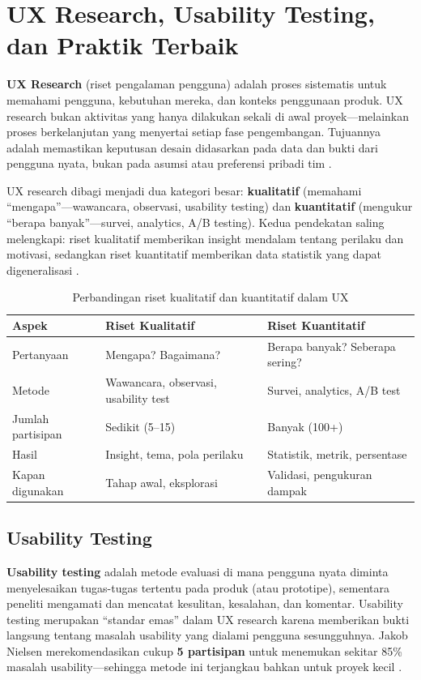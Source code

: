 ﻿\section{UX Research, Usability Testing, dan Praktik Terbaik}

\textbf{UX Research} (riset pengalaman pengguna) adalah proses sistematis untuk memahami pengguna, kebutuhan mereka, dan konteks penggunaan produk. UX research bukan aktivitas yang hanya dilakukan sekali di awal proyek---melainkan proses berkelanjutan yang menyertai setiap fase pengembangan. Tujuannya adalah memastikan keputusan desain didasarkan pada data dan bukti dari pengguna nyata, bukan pada asumsi atau preferensi pribadi tim \cite{nngroup}.

UX research dibagi menjadi dua kategori besar: \textbf{kualitatif} (memahami ``mengapa''---wawancara, observasi, usability testing) dan \textbf{kuantitatif} (mengukur ``berapa banyak''---survei, analytics, A/B testing). Kedua pendekatan saling melengkapi: riset kualitatif memberikan insight mendalam tentang perilaku dan motivasi, sedangkan riset kuantitatif memberikan data statistik yang dapat digeneralisasi \cite{ixdf}.

\begin{table}[H]
\centering
\begin{tabular}{|P{3cm}|P{4.5cm}|P{4.5cm}|}
\hline
\textbf{Aspek} & \textbf{Riset Kualitatif} & \textbf{Riset Kuantitatif} \\
\hline
Pertanyaan & Mengapa? Bagaimana? & Berapa banyak? Seberapa sering? \\
\hline
Metode & Wawancara, observasi, usability test & Survei, analytics, A/B test \\
\hline
Jumlah partisipan & Sedikit (5--15) & Banyak (100+) \\
\hline
Hasil & Insight, tema, pola perilaku & Statistik, metrik, persentase \\
\hline
Kapan digunakan & Tahap awal, eksplorasi & Validasi, pengukuran dampak \\
\hline
\end{tabular}
\caption{Perbandingan riset kualitatif dan kuantitatif dalam UX}
\end{table}

\subsection{Usability Testing}

\textbf{Usability testing} adalah metode evaluasi di mana pengguna nyata diminta menyelesaikan tugas-tugas tertentu pada produk (atau prototipe), sementara peneliti mengamati dan mencatat kesulitan, kesalahan, dan komentar. Usability testing merupakan ``standar emas'' dalam UX research karena memberikan bukti langsung tentang masalah usability yang dialami pengguna sesungguhnya. Jakob Nielsen merekomendasikan cukup \textbf{5 partisipan} untuk menemukan sekitar 85\% masalah usability---sehingga metode ini terjangkau bahkan untuk proyek kecil \cite{nngroup}.

